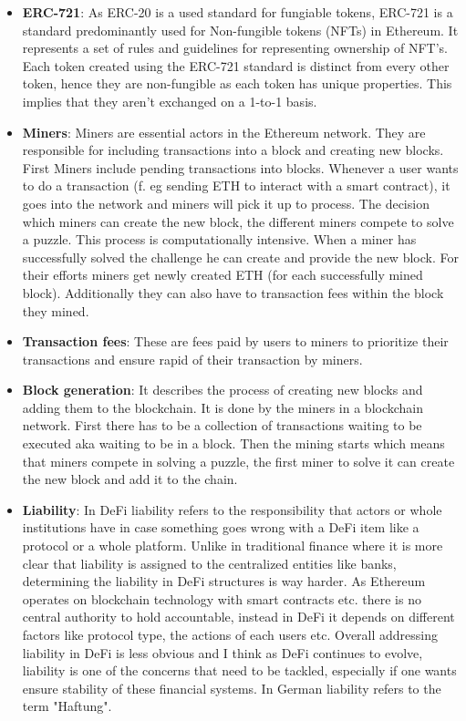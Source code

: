 \documentclass{article}
\begin{document}
\begin{itemize}
    \item \textbf{ERC-721}: As ERC-20 is a used standard for fungiable tokens, ERC-721 is a standard predominantly used for Non-fungible tokens (NFTs) in Ethereum. It represents a set of rules and guidelines for representing ownership of NFT's. Each token created using the ERC-721 standard is distinct from every other token, hence they are non-fungible as each token has unique properties. This implies that they aren't exchanged on a 1-to-1 basis.

    \item \textbf{Miners}: Miners are essential actors in the Ethereum network. They are responsible for including transactions into a block and creating new blocks. First Miners include pending transactions into blocks. Whenever a user wants to do a transaction (f. eg sending ETH to interact with a smart contract), it goes into the network and  miners will pick it up to process. The decision which miners can create the new block, the different miners compete to solve a puzzle. This process is computationally intensive. When a miner has successfully solved the challenge he can create and provide the new block. For their efforts miners get newly created ETH (for each successfully mined block). Additionally they can also have to transaction fees within the block they mined.

    \item \textbf{Transaction fees}:
    These are fees paid by users to miners to prioritize their transactions and ensure rapid of their transaction by miners.

    \item \textbf{Block generation}: It describes the process of creating new blocks and adding them to the blockchain. It is done by the miners in a blockchain network. First there has to be a collection of transactions waiting to be executed aka waiting to be in a block. Then the mining starts which means that miners compete in solving a puzzle, the first miner to solve it can create the new block and add it to the chain.

    \item \textbf {Liability}:  In DeFi liability refers to the responsibility that actors or whole institutions have in case something goes wrong with a DeFi item like a protocol or a whole platform. Unlike in traditional finance where it is more clear that liability is assigned to the centralized entities like banks, determining the liability in DeFi structures is way harder. As Ethereum operates on blockchain technology with smart contracts etc. there is no central authority to hold accountable, instead in DeFi it depends on different factors like protocol type, the actions of each users etc. Overall addressing liability in DeFi is less obvious and I think as DeFi continues to evolve, liability is one of the concerns that need to be tackled, especially if one wants ensure stability of these financial systems. In German liability refers to the term "Haftung".


\end{itemize}
\end{document}

